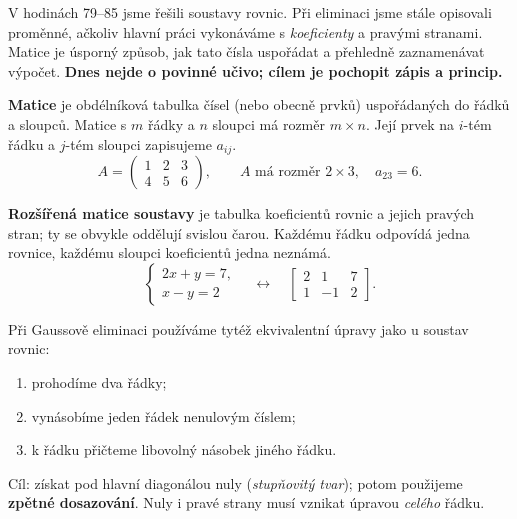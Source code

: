 \documentclass[11pt,a4paper]{article}
\begin{document}
V hodinách 79--85 jsme řešili soustavy rovnic. Při eliminaci jsme stále opisovali proměnné, ačkoliv hlavní práci vykonáváme s \emph{koeficienty} a pravými stranami. Matice je úsporný způsob, jak tato čísla uspořádat a přehledně zaznamenávat výpočet. \textbf{Dnes nejde o povinné učivo; cílem je pochopit zápis a princip.}

\begin{definiceBox}[title={Definice - Matice}]
\textbf{Matice} je obdélníková tabulka čísel (nebo obecně prvků) uspořádaných do řádků a sloupců. Matice s $m$ řádky a $n$ sloupci má rozměr $m\times n$. Její prvek na $i$-tém řádku a $j$-tém sloupci zapisujeme $a_{ij}$.
\[
A=\begin{pmatrix}1&2&3\\4&5&6\end{pmatrix},\qquad A\text{ má rozměr }2\times3,\quad a_{23}=6.
\]
\end{definiceBox}

\begin{definiceBox}[title={Definice - Rozšířená matice soustavy}]
\textbf{Rozšířená matice soustavy} je tabulka koeficientů rovnic a jejich pravých stran; ty se obvykle oddělují svislou čarou. Každému řádku odpovídá jedna rovnice, každému sloupci koeficientů jedna neznámá.
\[
\begin{cases}2x+y=7,\\x-y=2\end{cases}
\quad\longleftrightarrow\quad
\left[\begin{array}{cc|c}2&1&7\\1&-1&2\end{array}\right].
\]
\end{definiceBox}


Při Gaussově eliminaci používáme tytéž ekvivalentní úpravy jako u soustav rovnic:
\begin{enumerate}[label=\arabic*)]
\item prohodíme dva řádky;
\item vynásobíme jeden řádek nenulovým číslem;
\item k řádku přičteme libovolný násobek jiného řádku.
\end{enumerate}
Cíl: získat pod hlavní diagonálou nuly (\emph{stupňovitý tvar}); potom použijeme \textbf{zpětné dosazování}. Nuly i pravé strany musí vznikat úpravou \emph{celého} řádku.
\end{document}
